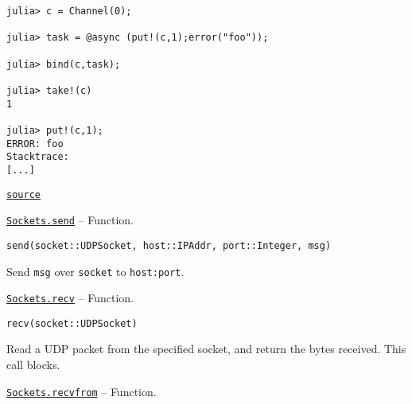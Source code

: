 \begin{adjustwidth}{2em}{0pt}
\begin{verbatim}
julia> c = Channel(0);

julia> task = @async (put!(c,1);error("foo"));

julia> bind(c,task);

julia> take!(c)
1

julia> put!(c,1);
ERROR: foo
Stacktrace:
[...]
\end{verbatim}



\href{https://github.com/JuliaLang/julia/blob/44fa15b1502a45eac76c9017af94332d4557b251/base/channels.jl#L194-L243}{\texttt{source}}


\end{adjustwidth}
\hypertarget{14996317088638800111}{} 
\hyperlink{14996317088638800111}{\texttt{Sockets.send}}  -- {Function.}

\begin{adjustwidth}{2em}{0pt}


\begin{verbatim}
send(socket::UDPSocket, host::IPAddr, port::Integer, msg)
\end{verbatim}

Send \texttt{msg} over \texttt{socket} to \texttt{host:port}.



\end{adjustwidth}
\hypertarget{8720184196970920051}{} 
\hyperlink{8720184196970920051}{\texttt{Sockets.recv}}  -- {Function.}

\begin{adjustwidth}{2em}{0pt}


\begin{verbatim}
recv(socket::UDPSocket)
\end{verbatim}

Read a UDP packet from the specified socket, and return the bytes received. This call blocks.



\end{adjustwidth}
\hypertarget{10286416413585635173}{} 
\hyperlink{10286416413585635173}{\texttt{Sockets.recvfrom}}  -- {Function.}

